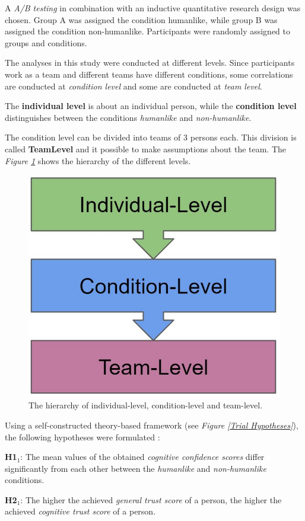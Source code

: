 \documentclass[sigchi]{acmart}
\begin{document}
A \textit{A/B testing} in combination with an inductive quantitative research design was chosen.
Group A was assigned the condition humanlike, while group B was assigned the condition non-humanlike. Participants were randomly assigned to groups and conditions. 

The analyses in this study were conducted at different levels.
Since participants work as a team and different teams have different conditions, some correlations are conducted at \textit{condition level} and some are conducted at \textit{team level}.

The \textbf{individual level} is about an individual person, while the \textbf{condition level} distinguishes between the conditions \textit{humanlike} and \textit{non-humanlike}.

The condition level can be divided into teams of 3 persons each. This division is called \textbf{TeamLevel} and it possible to make assumptions about the team. 
The \textit{Figure \ref{DifferentLevels}} shows the hierarchy of the different levels.

\begin{figure}[h]
  \centering
 		\includegraphics[width=0.5\linewidth]{Abbildungen/DifferentLevels.JPG}	
			\caption[The hierarchy levels]{The hierarchy of individual-level, condition-level and team-level.}
			\label{DifferentLevels}
\end{figure}	
	
Using a self-constructed theory-based framework (see \textit{Figure \ref{Trial Hypotheses}}), the following hypotheses were formulated :

\textbf{H1$_{1}$}: The mean values of the obtained \textit{cognitive confidence scores} differ significantly from each other between the \textit{humanlike} and \textit{non-humanlike} conditions.

\textbf{H2$_{1}$}: The higher the achieved \textit{general trust score} of a person, the higher the achieved \textit{cognitive trust score} of a person.
\end{document}

